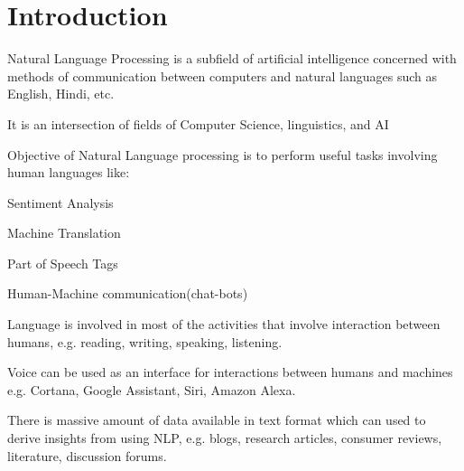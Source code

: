 	\section{Introduction}
	\begin{bulletedlist}
		\item Natural Language Processing is a subfield of artificial intelligence concerned with methods of communication between computers and natural languages such as English, Hindi, etc.
		\item It is an intersection of fields of Computer Science, linguistics, and AI 
		\item Objective of Natural Language processing is to perform useful tasks involving human languages like:
		\begin{bulletedlist}
			\item Sentiment Analysis
			\item Machine Translation
			\item Part of Speech Tags
			\item Human-Machine communication(chat-bots)
		\end{bulletedlist}
		\item Language is involved in most of the activities that involve interaction between humans, e.g. reading, writing, speaking, listening.
		\item Voice can be used as an interface for interactions between humans and machines e.g. Cortana, Google Assistant, Siri, Amazon Alexa.
		\item There is massive amount of data available in text format which can used to derive insights from using NLP, e.g. blogs, research articles, consumer reviews, literature, discussion forums.
	\end{bulletedlist}


